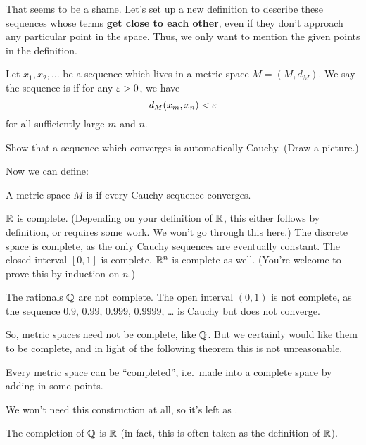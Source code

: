 That seems to be a shame.
Let's set up a new definition to describe these sequences whose terms
\textbf{get close to each other},
even if they don't approach any particular point in the space.
Thus, we only want to mention the given points in the definition.

\begin{definition}
	Let $x_1, x_2, \dots$ be a sequence which lives in a metric space $M = (M,d_M)$.
	We say the sequence is  if for any $\varepsilon > 0$, we have
	\[ d_M(x_m, x_n) < \varepsilon \]
	for all sufficiently large $m$ and $n$.
\end{definition}

\begin{ques}
	Show that a sequence which converges is automatically Cauchy.
	(Draw a picture.)
\end{ques}

Now we can define:
\begin{definition}
	A metric space $M$ is  if every
	Cauchy sequence converges.
\end{definition}

\begin{example}
	\listhack
	\begin{enumerate}[(a)]
		\ii $\RR$ is complete.
		(Depending on your definition of $\RR$,
		this either follows by definition, or requires some work.
		We won't go through this here.)
		\ii The discrete space is complete,
		as the only Cauchy sequences are eventually constant.
		\ii The closed interval $[0,1]$ is complete.
		\ii $\mathbb R^n$ is complete as well.
		(You're welcome to prove this by induction on $n$.)
	\end{enumerate}
\end{example}

\begin{example}
	\listhack
	\begin{enumerate}[(a)]
		\ii The rationals $\QQ$ are not complete.
		\ii The open interval $(0,1)$ is not complete,
		as the sequence $0.9$, $0.99$, $0.999$, $0.9999$, \dots
		is Cauchy but does not converge.
	\end{enumerate}
\end{example}

So, metric spaces need not be complete, like $\QQ$.
But we certainly would like them to be complete,
and in light of the following theorem this is not unreasonable.
\begin{theorem}
	[Completion]
	Every metric space can be ``completed'',
	i.e.\ made into a complete space by adding in some points.
\end{theorem}
We won't need this construction at all,
so it's left as .
\begin{example}
	[$\QQ$ completes to $\RR$]
	The completion of $\QQ$ is $\RR$
	(in fact, this is often taken as the definition of $\RR$).
\end{example}

